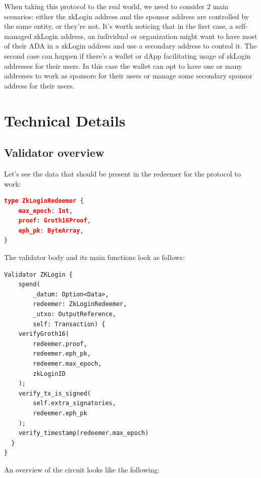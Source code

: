 \documentclass{article}
\begin{document}
When taking this protocol to the real world, we need to consider 2 main scenarios: either the zkLogin address and the sponsor address are controlled by the same entity, or they're not. It's worth noticing that in the first case, a self-managed zkLogin address, an individual or organization might want to have most of their ADA in a zkLogin address and use a secondary address to control it. The second case can happen if there's a wallet or dApp facilitating usage of zkLogin addresses for their users. In this case the wallet can opt to have one or many addresses to work as sponsors for their users or manage some secondary sponsor address for their users.


\section{Technical Details}
\subsection{Validator overview}
Let's see the data that should be present in the redeemer for the protocol to work:

\begin{lstlisting}[language=json, caption={Transaction Redeemer format}, label={lst:json}]
type ZkLoginRedeemer {
    max_epoch: Int,
    proof: Groth16Proof,
    eph_pk: ByteArray,
}
\end{lstlisting}

The validator body and its main functions look as follows:

\begin{lstlisting}[caption={Validator body}, label={lst:rust}]
Validator ZKLogin {
    spend(
        _datum: Option<Data>,
        redeemer: ZkLoginRedeemer,
        _utxo: OutputReference,
        self: Transaction) {
    verifyGroth16(
        redeemer.proof,
        redeemer.eph_pk,
        redeemer.max_epoch,
        zkLoginID
    );
    verify_tx_is_signed(
        self.extra_signatories,
        redeemer.eph_pk
    );
    verify_timestamp(redeemer.max_epoch)
  }
}
\end{lstlisting}

An overview of the circuit looks like the following:
\end{document}
